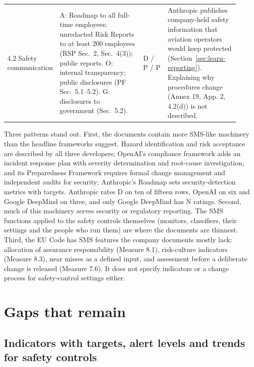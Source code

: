 \documentclass[11pt]{article}
\begin{document}
{\begin{longtable}{@{}>{\raggedright\arraybackslash}p{0.14\linewidth}>{\raggedright\arraybackslash}p{0.375\linewidth}>{\centering\arraybackslash}p{0.115\linewidth}>{\raggedright\arraybackslash}p{0.31\linewidth}@{}}
\pagebreak
{}4.2 Safety communication & A: Roadmap to all full-time employees; unredacted Risk Reports to at least 200 employees (RSP Sec.~2, Sec.~4(3)); public reports. O: internal transparency; public disclosures (PF Sec.~5.1--5.2). G: disclosures to government (Sec.~5.2). & D / P / P & Anthropic publishes company-held safety information that aviation operators would keep protected (Section~\ref{sec:learn-reporting}). Explaining why procedures change (Annex 19, App. 2, 4.2(d)) is not described. \\
\end{longtable}
}

Three patterns stand out. First, the documents contain more SMS-like machinery than the headline frameworks suggest. Hazard identification and risk acceptance are described by all three developers; OpenAI's compliance framework adds an incident response plan with severity determination and root-cause investigation, and its Preparedness Framework requires formal change management and independent audits for security; Anthropic's Roadmap sets security-detection metrics with targets. Anthropic rates D on ten of fifteen rows, OpenAI on six and Google DeepMind on three, and only Google DeepMind has N ratings. Second, much of this machinery serves security or regulatory reporting. The SMS functions applied to the safety controls themselves (monitors, classifiers, their settings and the people who run them) are where the documents are thinnest. Third, the EU Code has SMS features the company documents mostly lack: allocation of assurance responsibility (Measure 8.1), risk-culture indicators (Measure 8.3), near misses as a defined input, and assessment before a deliberate change is released (Measure 7.6). It does not specify indicators or a change process for safety-control settings either.

\section{Gaps that remain}\label{sec:gaps}

\subsection{Indicators with targets, alert levels and trends for safety controls}\label{sec:gap-indicators}
\end{document}

